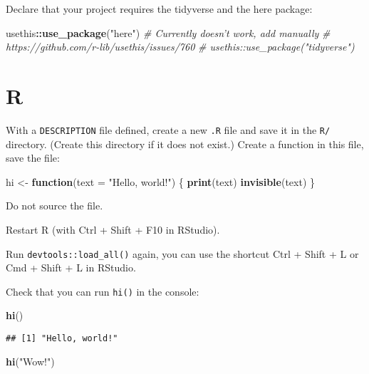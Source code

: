 \documentclass[]{book}
\newenvironment{Shaded}{\begin{snugshade}}{\end{snugshade}}
\newcommand{\CommentTok}[1]{\textcolor[rgb]{0.56,0.35,0.01}{\textit{#1}}}
\newcommand{\ControlFlowTok}[1]{\textcolor[rgb]{0.13,0.29,0.53}{\textbf{#1}}}
\newcommand{\DataTypeTok}[1]{\textcolor[rgb]{0.13,0.29,0.53}{#1}}
\newcommand{\KeywordTok}[1]{\textcolor[rgb]{0.13,0.29,0.53}{\textbf{#1}}}
\newcommand{\NormalTok}[1]{#1}
\newcommand{\OperatorTok}[1]{\textcolor[rgb]{0.81,0.36,0.00}{\textbf{#1}}}
\newcommand{\StringTok}[1]{\textcolor[rgb]{0.31,0.60,0.02}{#1}}
\begin{document}
Declare that your project requires the tidyverse and the here package:

\begin{Shaded}
\begin{Highlighting}[]
\NormalTok{usethis}\OperatorTok{::}\KeywordTok{use_package}\NormalTok{(}\StringTok{"here"}\NormalTok{)}
\CommentTok{# Currently doesn't work, add manually}
\CommentTok{# https://github.com/r-lib/usethis/issues/760}
\CommentTok{# usethis::use_package("tidyverse")}
\end{Highlighting}
\end{Shaded}

\hypertarget{r}{%
\section{R}\label{r}}

With a \texttt{DESCRIPTION} file defined, create a new \texttt{.R} file and save it in the \texttt{R/} directory.
(Create this directory if it does not exist.)
Create a function in this file, save the file:

\begin{Shaded}
\begin{Highlighting}[]
\NormalTok{hi <-}\StringTok{ }\ControlFlowTok{function}\NormalTok{(}\DataTypeTok{text =} \StringTok{"Hello, world!"}\NormalTok{) \{}
  \KeywordTok{print}\NormalTok{(text)}
  \KeywordTok{invisible}\NormalTok{(text)}
\NormalTok{\}}
\end{Highlighting}
\end{Shaded}

Do not source the file.

Restart R (with Ctrl + Shift + F10 in RStudio).

Run \texttt{devtools::load\_all()} again, you can use the shortcut Ctrl + Shift + L or Cmd + Shift + L in RStudio.

Check that you can run \texttt{hi()} in the console:

\begin{Shaded}
\begin{Highlighting}[]
\KeywordTok{hi}\NormalTok{()}
\end{Highlighting}
\end{Shaded}

\begin{verbatim}
## [1] "Hello, world!"
\end{verbatim}

\begin{Shaded}
\begin{Highlighting}[]
\KeywordTok{hi}\NormalTok{(}\StringTok{"Wow!"}\NormalTok{)}
\end{Highlighting}
\end{Shaded}
\end{document}
